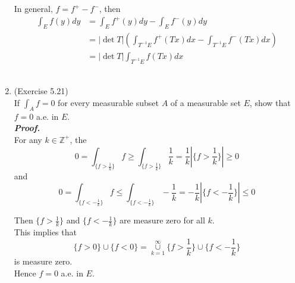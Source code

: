 \documentclass[a4paper,11pt]{article}
\begin{document}
\begin{enumerate}
 In general, $f = f^+ - f^-$, then
 $$\begin{aligned}
 \int_E f(y) dy
 &= \int_E f^+ (y) dy - \int_E f^- (y) dy\\
 &= |\det T| (\int_{T^{-1} E} f^+ (Tx) dx - \int_{T^{-1} E} f^- (Tx) dx)\\
 &= |\det T| \int_{T^{-1} E} f(Tx) dx
 \end{aligned}$$\






\item (Exercise 5.21)\\
 If $\int_A f = 0$ for every measurable subset $A$ of a measurable set $E$, show that $f = 0$ a.e. in $E$.\\
 \newline
 \textit{\textbf {Proof.}}\\

 For any $k \in \mathbb{Z}^+$, the
 $$0 = \int_{\{ f > \frac{1}{k} \}} f
 \geq \int_{\{ f > \frac{1}{k} \}} \frac{1}{k}
 = \frac{1}{k} |\{ f > \frac{1}{k} \}|
 \geq 0$$
 and
 $$0 = \int_{\{ f < -\frac{1}{k} \}} f
 \leq \int_{\{ f < -\frac{1}{k} \}} -\frac{1}{k}
 = -\frac{1}{k} |\{ f < -\frac{1}{k} \}|
 \leq 0$$
 
 Then $\{ f > \frac{1}{k} \}$ and $\{ f < -\frac{1}{k} \}$ are measure zero for all $k$.\\
 This implies that
 $$\{ f > 0 \} \cup \{ f < 0 \}
 = \underset{k = 1}{\overset{\infty}{\cup}} \{ f > \frac{1}{k} \} \cup \{ f < -\frac{1}{k} \}$$
 is measure zero.\\
 Hence $f = 0$ a.e. in $E$.




\end{enumerate}
\end{document}
